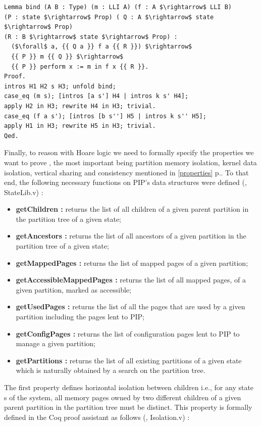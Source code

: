 \begin{lstlisting}[caption = {Hoare triples assignment rule in the shallow embedding},label = {shallow_assign},mathescape=true]
Lemma bind (A B : Type) (m : LLI A) (f : A $\rightarrow$ LLI B) 
(P : state $\rightarrow$ Prop) ( Q : A $\rightarrow$ state $\rightarrow$ Prop) 
(R : B $\rightarrow$ state $\rightarrow$ Prop) :
  ($\forall$ a, {{ Q a }} f a {{ R }}) $\rightarrow$ 
  {{ P }} m {{ Q }} $\rightarrow$ 
  {{ P }} perform x := m in f x {{ R }}.
Proof. 
intros H1 H2 s H3; unfold bind;
case_eq (m s); [intros [a s'] H4 | intros k s' H4];
apply H2 in H3; rewrite H4 in H3; trivial.
case_eq (f a s'); [intros [b s''] H5 | intros k s'' H5];
apply H1 in H3; rewrite H5 in H3; trivial.
Qed. 
\end{lstlisting}

Finally, to reason with Hoare logic we need to formally  specify the properties we want to prove \cite{PIPKernel}, the most important being partition memory isolation,
kernel data isolation, vertical sharing and consistency mentioned in \ref{properties} p.\pageref{properties}. To that end, the following necessary functions on PIP's data structures were defined (\cite{PIP}, StateLib.v) : 
\begin{itemize}
	\item \textbf{getChildren :} returns the list of all children of a given parent partition in the partition tree of a given state;
	\item \textbf{getAncestors :} returns the list of all ancestors of a given partition in the partition tree of a given state;
	\item \textbf{getMappedPages :} returns the list of mapped pages of a given partition;
	\item \textbf{getAccessibleMappedPages :} returns the list of all mapped pages, of a given partition, marked as accessible;
	\item \textbf{getUsedPages :} returns the list of all the pages that are used by a given partition including the pages lent to PIP;
		\item \textbf{getConfigPages :} returns the list of configuration pages lent to PIP to manage a given partition;
	\item \textbf{getPartitions :} returns the list of all existing partitions of a given state which is naturally obtained by a search on the partition tree.
\end{itemize} 
The first property defines horizontal isolation between children i.e., for any state s of the system, all memory pages owned by two different children of a given parent partition in the partition tree must be distinct. This property is formally defined in the Coq proof assistant as follows (\cite{PIP}, Isolation.v) :
